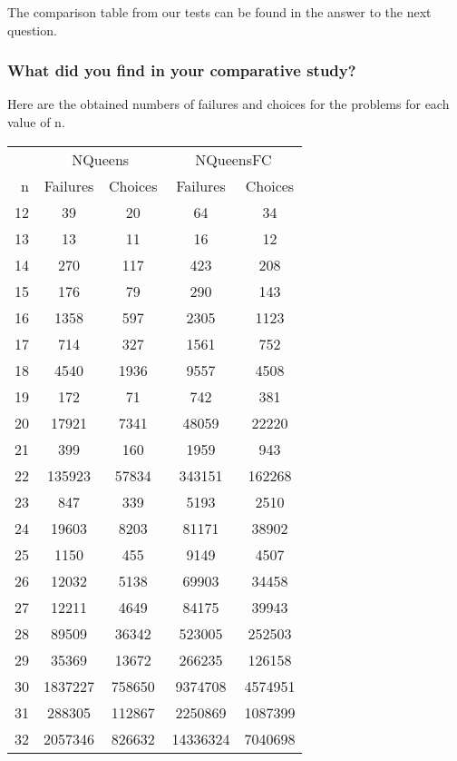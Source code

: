 \documentclass{eplDoc}
\begin{document}
The comparison table from our tests can be found in the answer to the next question. 

\subsubsection{What did you find in your comparative study?}
Here are the obtained numbers of failures and choices for the problems for each value of n. 
\begin{center}
\begin{tabular}{|r|cc|cc|}
\hline
 & \multicolumn{2}{c}{NQueens} & \multicolumn{2}{|c|}{NQueensFC} \\
 n & Failures & Choices & Failures & Choices \\ 
\hline
12 & 39 & 20 &               64 & 34 \\ 
13 & 13 & 11 &               16 & 12 \\ 
14 & 270 & 117 &             423 & 208 \\ 
15 & 176 & 79 &              290 & 143 \\ 
16 & 1358 & 597 &            2305 & 1123 \\ 
17 & 714 & 327 &             1561 & 752 \\ 
18 & 4540 & 1936 &           9557 & 4508 \\ 
19 & 172 & 71 &              742 & 381 \\ 
20 & 17921 & 7341 &          48059 & 22220 \\ 
21 & 399 & 160 &             1959 & 943 \\ 
22 & 135923 & 57834 &        343151 & 162268 \\ 
23 & 847 & 339 &             5193 & 2510 \\ 
24 & 19603 & 8203 &          81171 & 38902 \\ 
25 & 1150 & 455 &            9149 & 4507 \\ 
26 & 12032 & 5138 &          69903 & 34458 \\ 
27 & 12211 & 4649 &          84175 & 39943 \\ 
28 & 89509 & 36342 &         523005 & 252503 \\ 
29 & 35369 & 13672 &         266235 & 126158 \\ 
30 & 1837227 & 758650 &      9374708 & 4574951 \\ 
31 & 288305 & 112867 &       2250869 & 1087399 \\ 
32 & 2057346 & 826632 &      14336324 & 7040698 \\ 
\hline
\end{tabular}
\end{center}
\end{document}
